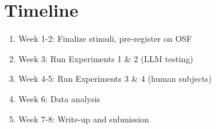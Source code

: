 \documentclass[11pt,a4paper]{article}
\begin{document}
\section{Timeline}

\begin{enumerate}
    \item Week 1-2: Finalize stimuli, pre-register on OSF
    \item Week 3: Run Experiments 1 \& 2 (LLM testing)
    \item Week 4-5: Run Experiments 3 \& 4 (human subjects)
    \item Week 6: Data analysis
    \item Week 7-8: Write-up and submission
\end{enumerate}
\end{document}
